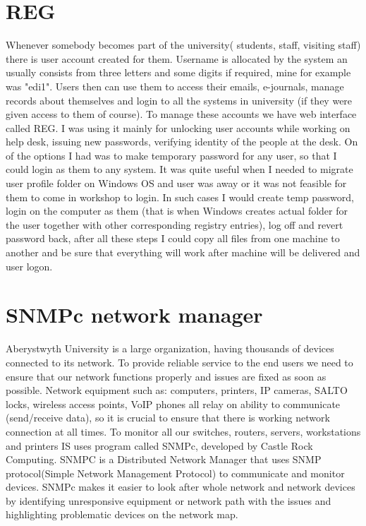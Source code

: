\documentclass[10pt,a4paper,headinclude=true]{report}
\begin{document}
\section{REG}
Whenever somebody becomes part of the university( students, staff, visiting staff) there is user account created for them. Username is allocated by the system an usually consists from three letters and some digits if required, mine for example was "edi1". Users then can use them to access their emails, e-journals, manage records about themselves and login to all the systems in university (if they were given access to them of course). To manage these accounts we have web interface called REG. I was using it mainly for unlocking user accounts while working on help desk, issuing new passwords, verifying identity of the people at the desk. On of the options I had was to make temporary password for any user, so that I could login as them to any system. It was quite useful when I needed to migrate user profile folder on Windows OS and user was away or it was not feasible for them to come in workshop to login. In such cases I would create temp password, login on the computer as them (that is when Windows creates actual folder for the user together with other corresponding registry entries), log off and revert password back, after all these steps I could copy all files from one machine to another and be sure that everything will work after machine will be delivered and user logon.
\section{SNMPc network manager}
Aberystwyth University is a large organization, having thousands of devices connected to its network. To provide reliable service to the end users we need to ensure that our network functions properly and issues are fixed as soon as possible. Network equipment such as: computers, printers, IP cameras, SALTO locks, wireless access points, VoIP phones all relay on ability to communicate (send/receive data), so it is crucial to ensure that there is working network connection at all times.  To monitor all our switches, routers, servers, workstations and printers IS uses program called SNMPc, developed by Castle Rock Computing. SNMPC is a Distributed Network Manager \cite{SNMPc} that uses SNMP protocol(Simple Network Management Protocol) to communicate and monitor devices. SNMPc makes it easier to look after whole network and network devices by identifying unresponsive equipment or network path with the issues and highlighting problematic devices on the network map. 
\end{document}
